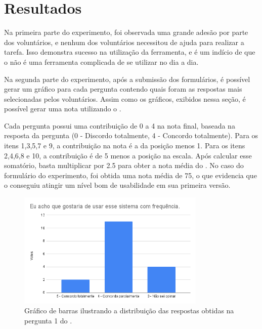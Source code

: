 \documentclass[12pt]{tcc}
\begin{document}
	\section{Resultados}
	\label{section:resultados}

	Na primeira parte do experimento, foi observada uma grande adesão por parte dos voluntários, e nenhum dos voluntários necessitou de ajuda para realizar a tarefa. Isso demonstra sucesso na utilização da ferramenta, e é um indício de que o  não é uma ferramenta complicada de se utilizar no dia a dia.

	Na segunda parte do experimento, após a submissão dos formulários, é possível gerar um gráfico para cada pergunta contendo quais foram as respostas mais selecionadas pelos voluntários. Assim como os gráficos, exibidos nessa seção, é possível gerar uma nota utilizando o .

	Cada pergunta possui uma contribuição de 0 a 4 na nota final, baseada na resposta da pergunta (0 - Discordo totalmente, 4 - Concordo totalmente). Para os itens 1,3,5,7 e 9, a contribuição na nota é a da posição menos 1. Para os itens 2,4,6,8 e 10, a contribuição é de 5 menos a posição na escala. Após calcular esse somatório, basta multiplicar por 2.5 para obter a nota média do  \citep{brooke1995sus}. No caso do formulário do experimento, foi obtida uma nota média de 75, o que evidencia que o  conseguiu atingir um nível bom de usabilidade em sua primeira versão.




	\begin{figure}[!ht]
		\centering
		\includegraphics[width=0.8\textwidth]{figures/respostas-pergunta-1.png}
		\caption[Respostas obtidas na pergunta 1 do formulário de avaliação]{Gráfico de barras ilustrando a distribuição das respostas obtidas na pergunta 1 do .}
		\label{fig:respostas-pergunta-1}
	\end{figure}
\end{document}
